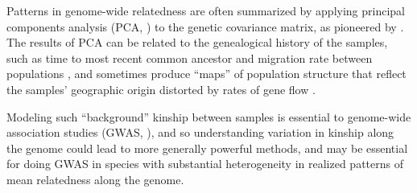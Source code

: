 \documentclass[11pt, oneside]{article}   	%
\newif\ifsubmission
\newcommand\citet{\cite}
\newcommand\citep{\cite}
\newcommand{\citetx}[2][]{\ifsubmission#1 \cite{#2}\else\citet{#2}\fi}
\begin{document}
Patterns in genome-wide relatedness are often summarized
by applying principal components analysis (PCA, \citep{patterson2006population}) 
to the genetic covariance matrix,
as pioneered by \citetx[Menozzi et al]{menozzi1978synthetic}.
The results of PCA can be related to the genealogical history of the samples, 
such as time to most recent common ancestor and migration rate between populations \citep{novembre2008interpreting,mcvean2009genealogical}, 
and sometimes produce ``maps'' of population structure
that reflect the samples' geographic origin distorted by rates of gene flow
\citep{novembre2008genes}.

Modeling such ``background'' kinship between samples
is essential to genome-wide association studies (GWAS, \citep{price2006principal,astle2009population}),
and so understanding variation in kinship along the genome 
could lead to more generally powerful methods,
and may be essential for doing GWAS in species with substantial heterogeneity in realized patterns of mean relatedness along the genome.
\end{document}
